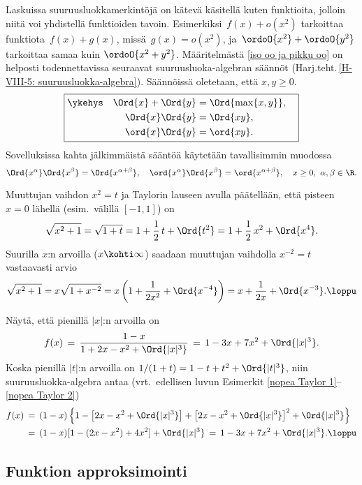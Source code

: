 Laskuissa suuruusluokkamerkintöjä on kätevä käsitellä kuten funktioita, jolloin niitä voi 
yhdistellä funktioiden tavoin. Esimerkiksi $\,f(x)+o(x^2)$ tarkoittaa funktiota $\,f(x)+g(x)$,
missä $\,g(x)=o(x^2)$, ja $\,\ordoO{x^2}+\ordoO{y^2}$ tarkoittaa samaa kuin $\ordoO{x^2+y^2}$.
Määritelmästä \ref{iso oo ja pikku oo} on helposti todennettavissa seuraavat
suuruusluoka-algebran säännöt (Harj.teht.\,\ref{H-VIII-5: suuruusluokka-algebra}). Säännöissä
oletetaan, että $x,y \ge 0$.
\[ \boxed{ \begin{aligned} 
\ykehys\quad \Ord{x}+\Ord{y} &= \Ord{\max\{x,y\}}, \quad \\
\Ord{x}\Ord{y}               &= \Ord{xy}, \quad \\
\ord{x}\Ord{y}               &= \ord{xy}. \quad
           \end{aligned} } \]
Sovelluksissa kahta jälkimmäistä sääntöä käytetään tavallisimmin muodossa
\[
\Ord{x^\alpha}\Ord{x^\beta}=\Ord{x^{\alpha+\beta}}, \quad
\ord{x^\alpha}\Ord{x^\beta}=\ord{x^{\alpha+\beta}}, \quad x \ge 0,\ \alpha,\beta\in\R.
\]
\begin{Exa} Muuttujan vaihdon $x^2=t$ ja Taylorin lauseen avulla päätellään, että pisteen
$x=0$ lähellä (esim.\ välillä $[-1,1]$) on
\[
\sqrt{x^2+1} = \sqrt{1+t} = 1+\frac{1}{2}\,t + \Ord{t^2} = 1+\frac{1}{2}\,x^2+\Ord{x^4}.
\]
Suurilla $x$:n arvoilla ($x\kohti\infty$) saadaan muuttujan vaihdolla $x^{-2}=t$ vastaavasti
arvio
\[
\sqrt{x^2+1} = x\sqrt{1+x^{-2}} = x\left(1+\frac{1}{2x^2}+\Ord{x^{-4}}\right)
                                = x+\frac{1}{2x}+\Ord{x^{-3}}. \loppu
\]
\end{Exa}
\begin{Exa} Näytä, että pienillä $|x|$:n arvoilla on
\[
f(x) \,=\, \frac{1-x}{1+2x-x^2+\Ord{|x|^3}} \,=\,1-3x+7x^2+\Ord{|x|^3}.
\]
\ratk Koska pienillä $|t|$:n arvoilla on $1/(1+t)=1-t+t^2+\Ord{|t|^3}$, niin
suuruusluokka-algebra antaa
(vrt.\ edellisen luvun Esimerkit \ref{nopea Taylor 1}--\ref{nopea Taylor 2})
\begin{align*}
f(x)\,&=\, (1-x)\left\{1-\left[2x-x^2+\Ord{|x|^3}\right]
                        +\left[2x-x^2+\Ord{|x|^3}\right]^2+\Ord{|x|^3}\right\} \\
    \,&=\, (1-x)[1-(2x-x^2)+4x^2]+\Ord{|x|^3} \,=\, 1-3x+7x^2+\Ord{|x|^3}. \loppu
\end{align*}
\end{Exa}

\subsection*{Funktion approksimointi}

